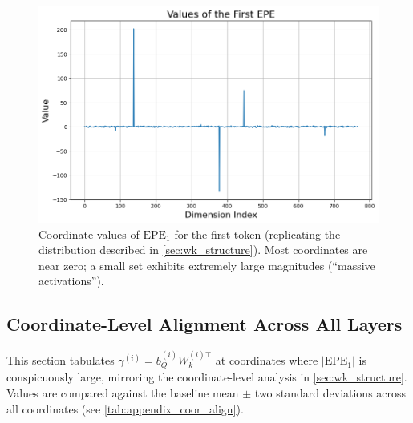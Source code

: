 \documentclass[11pt]{article}
\begin{document}
\begin{figure}[t]
  \includegraphics[width=\columnwidth]{figures/massive_activations_in_ppe.png}
  \caption{Coordinate values of $\mathrm{EPE}_1$ for the first token (replicating the distribution described in \cref{sec:wk_structure}). Most coordinates are near zero; a small set exhibits extremely large magnitudes (``massive activations'').}
  \label{fig:appendix_massive_activations}
\end{figure}

\subsection{Coordinate-Level Alignment Across All Layers} \label{app:coor_align}

This section tabulates $\gamma^{(i)}=b_Q^{(i)}W_k^{(i)\top}$ at coordinates where $|\mathrm{EPE}_1|$ is conspicuously large, mirroring the coordinate-level analysis in \cref{sec:wk_structure}. Values are compared against the baseline mean $\pm$ two standard deviations across all coordinates (see \cref{tab:appendix_coor_align}).
\end{document}
